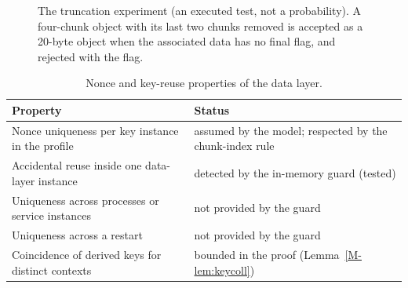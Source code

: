 \documentclass[pdflatex,sn-mathphys-num]{sn-jnl}
\begin{document}
\begin{figure}[htbp]
\centering
\figbox{}
\caption{The truncation experiment (an executed test, not a probability). A four-chunk object with its last two chunks removed is accepted as a 20-byte object when the associated data has no final flag, and rejected with the flag.}\label{fig:truncation}
\end{figure}

\begin{table}[htbp]
\caption{Nonce and key-reuse properties of the data layer.}\label{tab:nonce}
\centering\footnotesize
\begin{tabularx}{\linewidth}{@{}>{\raggedright\arraybackslash}p{.46\linewidth}Y@{}}\toprule
Property & Status\\\midrule
Nonce uniqueness per key instance in the profile & assumed by the model; respected by the chunk-index rule\\
Accidental reuse inside one data-layer instance & detected by the in-memory guard (tested)\\
Uniqueness across processes or service instances & not provided by the guard\\
Uniqueness across a restart & not provided by the guard\\
Coincidence of derived keys for distinct contexts & bounded in the proof (Lemma~\ref{M-lem:keycoll})\\\bottomrule
\end{tabularx}
\end{table}
\end{document}
